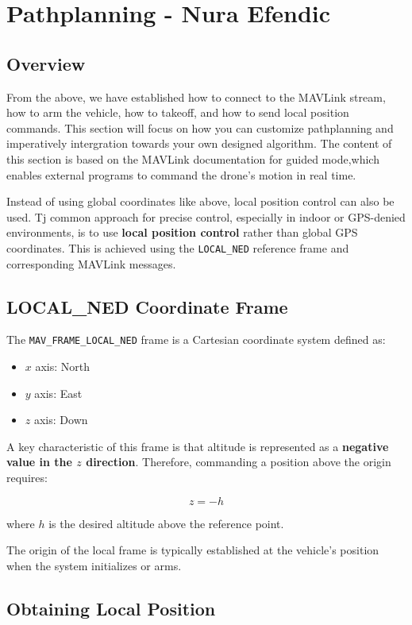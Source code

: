 \section{Pathplanning - Nura Efendic}
\label{sec:Pathplanning}

\subsection{Overview}
From the above, we have established how to connect to the MAVLink stream, how to arm the vehicle, how to takeoff, and how to send local position commands. This section will focus on how you can customize pathplanning and imperatively intergration towards your own designed algorithm. The content of this section is based on the MAVLink documentation for guided mode,which enables external programs to command the drone's motion in real time.

Instead of using global coordinates like above, local position control can also be used. Tj common approach for precise control, especially in indoor or GPS-denied environments, is to use \textbf{local position control} rather than global GPS coordinates. This is achieved using the \texttt{LOCAL\_NED} reference frame and corresponding MAVLink messages.

\subsection{LOCAL\_NED Coordinate Frame}

The \texttt{MAV\_FRAME\_LOCAL\_NED} frame is a Cartesian coordinate system defined as:

\begin{itemize}
    \item $x$ axis: North
    \item $y$ axis: East
    \item $z$ axis: Down
\end{itemize}

A key characteristic of this frame is that altitude is represented as a \textbf{negative value in the $z$ direction}. Therefore, commanding a position above the origin requires:

\[
z = -h
\]

where $h$ is the desired altitude above the reference point.

The origin of the local frame is typically established at the vehicle’s position when the system initializes or arms.

\subsection{Obtaining Local Position}

